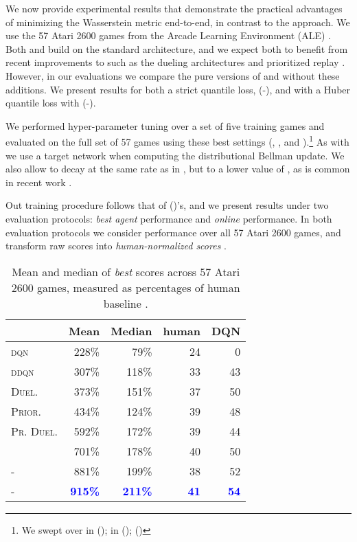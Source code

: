 \documentclass[letterpaper]{article}
\newcommand{\citet}[1]{\citeauthor{#1} (\citeyear{#1})}
\begin{document}
We now provide experimental results that demonstrate the practical advantages of minimizing the Wasserstein metric end-to-end, in contrast to the  approach. We use the 57 Atari 2600 games from the Arcade Learning Environment (ALE) \cite{bellemare13arcade}. Both  and  build on the standard  architecture, and we expect both to benefit from recent improvements to  such as the dueling architectures \cite{wang2016dueling} and prioritized replay \cite{schaul16prioritized}. However, in our evaluations we compare the pure versions of  and  without these additions. We present results for both a strict quantile loss,  (-), and with a Huber quantile loss with  (-). 

We performed hyper-parameter tuning over a set of five training games and evaluated on the full set of 57 games using these best settings (, , and ).\footnote{We swept over  in ();  in ();  ()} As with  we use a target network when computing the distributional Bellman update. We also allow  to decay at the same rate as in , but to a lower value of , as is common in recent work \cite{c51,wang2016dueling,vanhasselt16deep}.

Out training procedure follows that of \citet{mnih15nature}'s, and we present results under two evaluation protocols: \textit{best agent} performance and \textit{online} performance. In both evaluation protocols we consider performance over all 57 Atari 2600 games, and transform raw scores into \textit{human-normalized scores} \cite{vanhasselt16deep}.

\begin{table}[ht]
\begin{center}
\begin{tabular}{ l | r | r | r | r }
\multicolumn{1}{c}{} & \mbox{\textbf{Mean}} & \mbox{\textbf{Median}} & \mbox{\textbf{human}} & \mbox{\textbf{DQN}} \\
\hline
\textsc{dqn}  &   228\% & 79\% & 24 & 0 \\
\textsc{ddqn}   &   307\% & 118\% & 33 & 43 \\
\textsc{Duel.}   &   373\% & 151\% & 37 & 50 \\
\textsc{Prior.}   &   434\% & 124\% & 39 & 48 \\
\textsc{Pr. Duel.}   &   592\% & 172\% & 39 & 44 \\
\hline
\hline
   &   701\% & 178\% & 40 & 50 \\
\hline
-   &   881\% & 199\% & 38 & 52 \\
-   &   \textbf{\textcolor{blue}{915\%}} & \textbf{\textcolor{blue}{211\%}} & \textbf{\textcolor{blue}{41}} & \textbf{\textcolor{blue}{54}} \\
\end{tabular}
\end{center}
\caption{Mean and median of \textit{best} scores across 57 Atari 2600 games, measured as percentages of human baseline \cite{nair15massively}.}
\label{fig:perc_scores}
\end{table}
\end{document}
